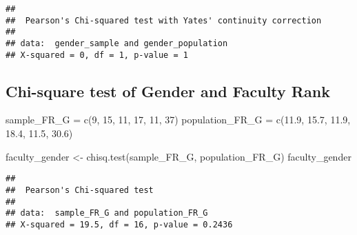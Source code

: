 \documentclass[]{article}
\newenvironment{Shaded}{\begin{snugshade}}{\end{snugshade}}
\newcommand{\DecValTok}[1]{\textcolor[rgb]{0.00,0.00,0.81}{#1}}
\newcommand{\FloatTok}[1]{\textcolor[rgb]{0.00,0.00,0.81}{#1}}
\newcommand{\FunctionTok}[1]{\textcolor[rgb]{0.00,0.00,0.00}{#1}}
\newcommand{\NormalTok}[1]{#1}
\newcommand{\OtherTok}[1]{\textcolor[rgb]{0.56,0.35,0.01}{#1}}
\begin{document}
\begin{verbatim}
## 
##  Pearson's Chi-squared test with Yates' continuity correction
## 
## data:  gender_sample and gender_population
## X-squared = 0, df = 1, p-value = 1
\end{verbatim}

\hypertarget{chi-square-test-of-gender-and-faculty-rank}{%
\subsection{Chi-square test of Gender and Faculty
Rank}\label{chi-square-test-of-gender-and-faculty-rank}}

\begin{Shaded}
\begin{Highlighting}[]
\NormalTok{sample\_FR\_G }\OtherTok{=} \FunctionTok{c}\NormalTok{(}\DecValTok{9}\NormalTok{, }\DecValTok{15}\NormalTok{, }\DecValTok{11}\NormalTok{, }\DecValTok{17}\NormalTok{, }\DecValTok{11}\NormalTok{, }\DecValTok{37}\NormalTok{)}
\NormalTok{population\_FR\_G }\OtherTok{=} \FunctionTok{c}\NormalTok{(}\FloatTok{11.9}\NormalTok{, }\FloatTok{15.7}\NormalTok{, }\FloatTok{11.9}\NormalTok{, }\FloatTok{18.4}\NormalTok{, }\FloatTok{11.5}\NormalTok{, }\FloatTok{30.6}\NormalTok{)}

\NormalTok{faculty\_gender }\OtherTok{\textless{}{-}} \FunctionTok{chisq.test}\NormalTok{(sample\_FR\_G, population\_FR\_G)}
\NormalTok{faculty\_gender}
\end{Highlighting}
\end{Shaded}

\begin{verbatim}
## 
##  Pearson's Chi-squared test
## 
## data:  sample_FR_G and population_FR_G
## X-squared = 19.5, df = 16, p-value = 0.2436
\end{verbatim}
\end{document}
